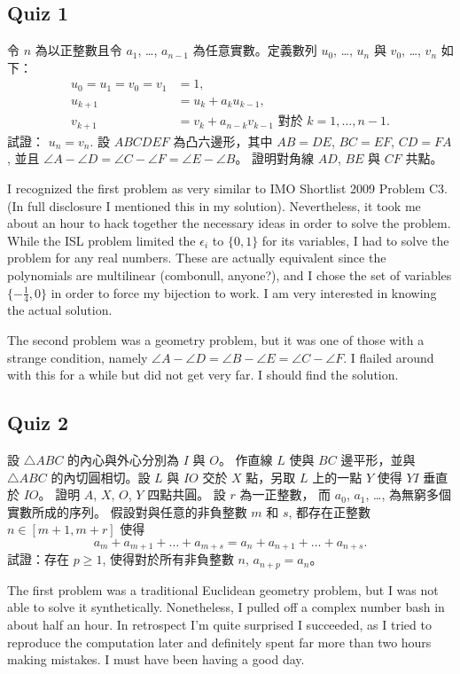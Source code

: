 \documentclass[11pt]{scrreprt}
\begin{document}
\subsection{Quiz 1}
\begin{enumerate}
  \ii 令 $n$ 為以正整數且令 $a_1$, \dots, $a_{n-1}$ 為任意實數。定義數列 $u_0$, \dots, $u_n$ 與 $v_0$, \dots, $v_n$ 如下：
  \begin{align*}
    u_0 = u_1 = v_0 = v_1 &= 1, \\
    u_{k+1} &= u_k + a_ku_{k-1}, \\
    v_{k+1} &= v_k + a_{n-k} v_{k-1}
    \text{ 對於 $k=1,\dots,n-1$}
    .
  \end{align*}
  試證： $u_n = v_n$. %
  \ii 設 $ABCDEF$ 為凸六邊形，其中 $AB=DE$, $BC=EF$, $CD=FA$, 並且 $\angle A - \angle D = \angle C - \angle F = \angle E - \angle B$。 證明對角線 $AD$, $BE$ 與 $CF$ 共點。 %
\end{enumerate}
I recognized the first problem as very similar to IMO Shortlist 2009 Problem C3.
(In full disclosure I mentioned this in my solution).
Nevertheless, it took me about an hour to hack together the necessary ideas in order to solve the problem.
While the ISL problem limited the $\epsilon_i$ to $\{0,1\}$ for its variables,
I had to solve the problem for any real numbers.
These are actually equivalent since the polynomials are multilinear (combonull, anyone?),
and I chose the set of variables $\{-\frac 14, 0\}$ in order to force my bijection to work.
I am very interested in knowing the actual solution.

The second problem was a geometry problem, but it was one of those with a strange condition,
namely $\angle A - \angle D = \angle B - \angle E = \angle C - \angle F$.
I flailed around with this for a while but did not get very far. I should find the solution.

\subsection{Quiz 2}
\begin{enumerate}
  \ii 設 $\triangle ABC$ 的內心與外心分別為 $I$ 與 $O$。
  作直線 $L$ 使與 $BC$ 邊平形，並與 $\triangle ABC$ 的內切圓相切。設 $L$ 與 $IO$ 交於 $X$ 點，另取 $L$ 上的一點 $Y$ 使得 $YI$ 垂直於 $IO$。
  證明 $A$, $X$, $O$, $Y$ 四點共圓。
  \ii 設 $r$ 為一正整數， 而 $a_0$, $a_1$, \dots, 為無窮多個實數所成的序列。
  假設對與任意的非負整數 $m$ 和 $s$, 都存在正整數 $n \in [m+1, m+r]$ 使得
  \[ a_m + a_{m+1} + \dots + a_{m+s} = a_n + a_{n+1} + \dots + a_{n+s}. \]
  試證：存在 $p \ge 1$, 使得對於所有非負整數 $n$, $a_{n+p} = a_n$。 %
\end{enumerate}
The first problem was a traditional Euclidean geometry problem, but I was not able to solve it synthetically.
Nonetheless, I pulled off a complex number bash in about half an hour.
In retrospect I'm quite surprised I succeeded,
as I tried to reproduce the computation later and definitely spent far more than two hours making mistakes.
I must have been having a good day.
\end{document}
